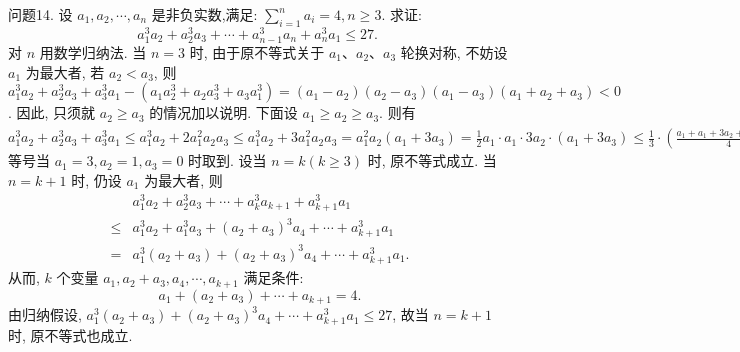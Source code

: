 问题14. 设 $a_1, a_2, \cdots, a_n$ 是非负实数,满足: $\sum_{i=1}^n a_i=4, n \geqslant 3$. 求证:
$$
a_1^3 a_2+a_2^3 a_3+\cdots+a_{n-1}^3 a_n+a_n^3 a_1 \leqslant 27 \text {. }
$$
对 $n$ 用数学归纳法.
当 $n=3$ 时, 由于原不等式关于 $a_1 、 a_2 、 a_3$ 轮换对称, 不妨设 $a_1$ 为最大者, 若 $a_2<a_3$, 则 $a_1^3 a_2+a_2^3 a_3+a_3^3 a_1-\left(a_1 a_2^3+a_2 a_3^3+\right. \left.a_3 a_1^3\right)=\left(a_1-a_2\right)\left(a_2-a_3\right)\left(a_1-a_3\right)\left(a_1+a_2+a_3\right)<0$.
因此, 只须就 $a_2 \geqslant a_3$ 的情况加以说明.
下面设 $a_1 \geqslant a_2 \geqslant a_3$. 则有 $a_1^3 a_2+ a_2^3 a_3+a_3^3 a_1 \leqslant a_1^3 a_2+2 a_1^2 a_2 a_3 \leqslant a_1^3 a_2+3 a_1^2 a_2 a_3=a_1^2 a_2\left(a_1+3 a_3\right)=\frac{1}{2} a_1 \cdot a_1 \cdot 3 a_2 \cdot\left(a_1+3 a_3\right) \leqslant \frac{1}{3} \cdot\left(\frac{a_1+a_1+3 a_2+a_1+3 a_3}{4}\right)^4=\frac{1}{3} \cdot\left[\frac{3\left(a_1+a_2+a_3\right)}{4}\right]^4=27$
等号当 $a_1=3, a_2=1, a_3=0$ 时取到.
设当 $n=k(k \geqslant 3)$ 时, 原不等式成立.
当 $n=k+1$ 时, 仍设 $a_1$ 为最大者, 则
$$
\begin{aligned}
& a_1^3 a_2+a_2^3 a_3+\cdots+a_k^3 a_{k+1}+a_{k+1}^3 a_1 \\
\leqslant & a_1^3 a_2+a_1^3 a_3+\left(a_2+a_3\right)^3 a_4+\cdots+a_{k+1}^3 a_1 \\
= & a_1^3\left(a_2+a_3\right)+\left(a_2+a_3\right)^3 a_4+\cdots+a_{k+1}^3 a_1 .
\end{aligned}
$$
从而, $k$ 个变量 $a_1, a_2+a_3, a_4, \cdots, a_{k+1}$ 满足条件:
$$
a_1+\left(a_2+a_3\right)+\cdots+a_{k+1}=4 .
$$
由归纳假设, $a_1^3\left(a_2+a_3\right)+\left(a_2+a_3\right)^3 a_4+\cdots+a_{k+1}^3 a_1 \leqslant 27$, 故当 $n=k+1$ 时, 原不等式也成立.



